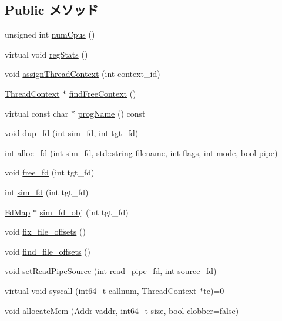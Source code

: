\subsection*{Public メソッド}
\begin{DoxyCompactItemize}
\item 
unsigned int \hyperlink{classProcess_ac5c70b967092e10582ce2f165e174890}{numCpus} ()
\item 
virtual void \hyperlink{classProcess_a4dc637449366fcdfc4e764cdf12d9b11}{regStats} ()
\item 
void \hyperlink{classProcess_aec797e960b8c534f9105fbd4ee83f2c7}{assignThreadContext} (int context\_\-id)
\item 
\hyperlink{classThreadContext}{ThreadContext} $\ast$ \hyperlink{classProcess_ac26b4f23be05f684886e00f4f7526a0e}{findFreeContext} ()
\item 
virtual const char $\ast$ \hyperlink{classProcess_a580745d5543eb666c37e2a5f37fb32a0}{progName} () const 
\item 
void \hyperlink{classProcess_a292e48ab06f50224924454b6c74c90e4}{dup\_\-fd} (int sim\_\-fd, int tgt\_\-fd)
\item 
int \hyperlink{classProcess_aa98d99fb9a7db11be09b4e5b818d1795}{alloc\_\-fd} (int sim\_\-fd, std::string filename, int flags, int mode, bool pipe)
\item 
void \hyperlink{classProcess_a8c39614271eb6220f2db1bd774f43849}{free\_\-fd} (int tgt\_\-fd)
\item 
int \hyperlink{classProcess_ac7bb7ef35884d6fb4a2c02f167ab7679}{sim\_\-fd} (int tgt\_\-fd)
\item 
\hyperlink{classProcess_1_1FdMap}{FdMap} $\ast$ \hyperlink{classProcess_ac12196dd197c6731a021e211a95edb2d}{sim\_\-fd\_\-obj} (int tgt\_\-fd)
\item 
void \hyperlink{classProcess_a65bfd573cf5c576db37f79195adb9cbc}{fix\_\-file\_\-offsets} ()
\item 
void \hyperlink{classProcess_aec771386421777782ca6bec97dd93db3}{find\_\-file\_\-offsets} ()
\item 
void \hyperlink{classProcess_a06811a348d456174f7ad9f2b8f03a129}{setReadPipeSource} (int read\_\-pipe\_\-fd, int source\_\-fd)
\item 
virtual void \hyperlink{classProcess_a0abb4f4856f531e5b48484f5114a5bf9}{syscall} (int64\_\-t callnum, \hyperlink{classThreadContext}{ThreadContext} $\ast$tc)=0
\item 
void \hyperlink{classProcess_aaebf8af407502fcc035e598795f77089}{allocateMem} (\hyperlink{base_2types_8hh_af1bb03d6a4ee096394a6749f0a169232}{Addr} vaddr, int64\_\-t size, bool clobber=false)

\end{DoxyCompactItemize}
